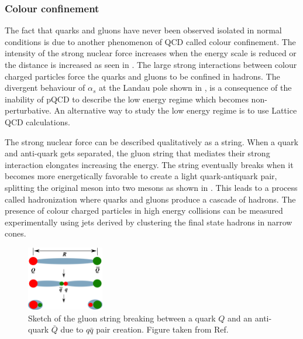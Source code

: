 \subsubsection{Colour confinement}

The fact that quarks and gluons have never been observed isolated in normal conditions is due to another phenomenon of QCD called colour confinement. The intensity of the strong nuclear force increases when the energy scale is reduced or the distance is increased as seen in . The large strong interactions between colour charged particles force the quarks and gluons to be confined in hadrons. The divergent behaviour of $\alpha_{s}$ at the Landau pole shown in , is a consequence of the inability of pQCD to describe the low energy regime which becomes non-perturbative. An alternative way to study the low energy regime is to use Lattice QCD calculations.

The strong nuclear force can be described qualitatively as a string. When a quark and anti-quark gets separated, the gluon string that mediates their strong interaction elongates increasing the energy. The string eventually breaks when it becomes more energetically favorable to create a light quark-antiquark pair, splitting the original meson into two mesons as shown in . This leads to a process called hadronization where quarks and gluons produce a cascade of hadrons. The presence of colour charged particles in high energy collisions can be measured experimentally using jets derived by clustering the final state hadrons in narrow cones.

\begin{figure}[!htbp]
 \begin{center}
  \includegraphics[width=0.3\textwidth]{Figures/Introduction/StandardModel/QCDConfinement.png}
 \end{center}
 \caption{Sketch of the gluon string breaking between a quark $Q$ and an anti-quark $\bar{Q}$ due to $q\bar{q}$ pair creation. Figure taken from Ref.~\cite{QCDConfinement_Figure}}
 \label{fig:QCDConfinement}
\end{figure}

